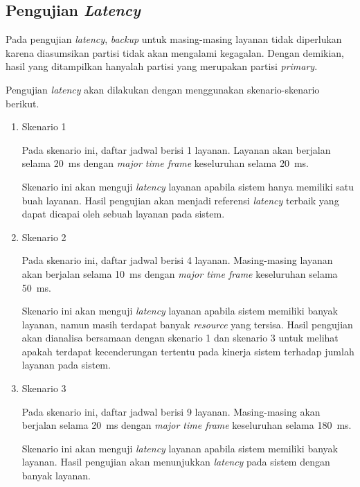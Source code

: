 \subsection{Pengujian \textit{Latency}}

Pada pengujian \textit{latency}, \textit{backup} untuk masing-masing layanan tidak diperlukan
karena diasumsikan partisi tidak akan mengalami kegagalan. Dengan demikian, hasil yang
ditampilkan hanyalah partisi yang merupakan partisi \textit{primary}.

Pengujian \textit{latency} akan dilakukan dengan menggunakan skenario-skenario berikut.

\begin{enumerate}
	\item Skenario 1

		Pada skenario ini, daftar jadwal berisi 1 layanan. Layanan akan berjalan
		selama \SI{20}{\milli\second} dengan \textit{major time frame} keseluruhan
		selama \SI{20}{\milli\second}.

		Skenario ini akan menguji \textit{latency} layanan apabila sistem hanya memiliki
		satu buah layanan. Hasil pengujian akan menjadi referensi \textit{latency}
		terbaik yang dapat dicapai oleh sebuah layanan pada sistem.

	\item Skenario 2

		Pada skenario ini, daftar jadwal berisi 4 layanan. Masing-masing layanan akan
		berjalan selama \SI{10}{\milli\second} dengan \textit{major time frame}
		keseluruhan selama \SI{50}{\milli\second}.

		Skenario ini akan menguji \textit{latency} layanan apabila sistem memiliki
		banyak layanan, namun masih terdapat banyak \textit{resource} yang tersisa.
		Hasil pengujian akan dianalisa bersamaan dengan skenario 1 dan skenario 3 untuk
		melihat apakah terdapat kecenderungan tertentu pada kinerja sistem terhadap
		jumlah layanan pada sistem.

	\item Skenario 3

		Pada skenario ini, daftar jadwal berisi 9 layanan. Masing-masing akan berjalan
		selama \SI{20}{\milli\second} dengan \textit{major time frame} keseluruhan
		selama \SI{180}{\milli\second}.

		Skenario ini akan menguji \textit{latency} layanan apabila sistem memiliki
		banyak layanan. Hasil pengujian akan menunjukkan \textit{latency} pada sistem
		dengan banyak layanan.

\end{enumerate}

